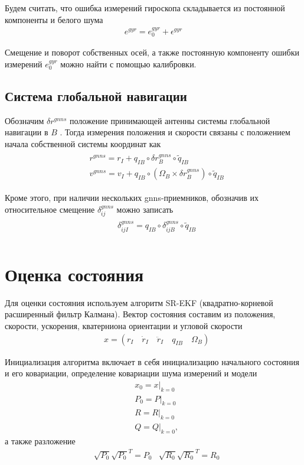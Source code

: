 \documentclass[a4paper,12pt]{article}
\begin{document}
Будем считать, что ошибка измерений гироскопа складывается из постоянной компоненты  и белого шума
\begin{align} 
e^{\textit{gyr}} = e_{0}^{\textit{gyr}} + \epsilon^{\textit{gyr}}
\end{align}

Смещение и поворот собственных осей, а также постоянную компоненту ошибки измерений $e_{0}^{\textit{gyr}}$ можно найти с помощью калибровки.

\subsection{Система глобальной навигации}
Обозначим $\delta r^{gnns}$ положение принимающей антенны системы глобальной навигации в $B$ . Тогда измерения положения и скорости связаны с положением начала собственной системы координат как
\begin{align} \label{eq:gnns_mes_model}
\begin{split}
&r^{gnns} = r_I + q_{IB} \circ \delta r^{gnns}_B \circ \tilde{q}_{IB} \\
&v^{gnns} = v_I + q_{IB} \circ  (\Omega_B \times \delta r^{gnns}_B) \circ \tilde{q}_{IB}
\end{split}
\end{align}

Кроме этого, при наличии нескольких gnns-приемников, обозначив их относительное смещение
${\delta}_{ij}^{gnns}$
можно записать
\begin{align} \label{eq:d_gnns_mes_model}
\begin{split}
&\delta_{ijI}^{gnns} = q_{IB} \circ \delta_{ijB} ^{gnns} \circ \tilde{q}_{IB} \\
\end{split}
\end{align}

\section{Оценка состояния}
Для оценки состояния используем алгоритм SR-EKF (квадратно-корневой расширенный фильтр Калмана). Вектор состояния составим из положения, скорости, ускорения, кватерниона ориентации и угловой скорости
\begin{align} 
&x = (r_I \quad \dot{r}_I \quad \ddot{r}_I \quad q_{IB} \quad \Omega_B)
\end{align}

Инициализация алгоритма включает в себя инициализацию начального состояния и его ковариации, определение ковариации шума измерений и модели
\begin{align}
&x_0 = x|_{k=0} \\
&P_0 = P|_{k=0} \\
&R = R|_{k=0} \\
&Q = Q|_{k=0},
\end{align} 
а также разложение
\begin{align}
&\sqrt{P_0} \sqrt{P_0}^T= P_0
&\sqrt{R_0} \sqrt{R_0}^T= R_0
\end{align} 
\end{document}

